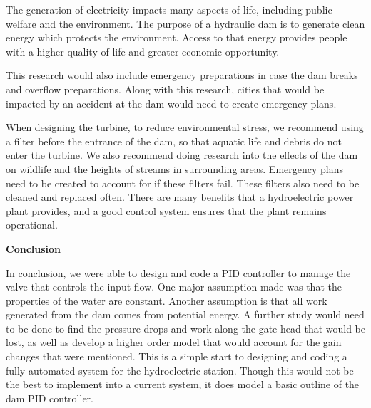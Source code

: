 \documentclass{article}
\begin{document}
\begin{multicols*}{2}
        The generation of electricity impacts many aspects of life, including public welfare and the environment. The purpose of a hydraulic dam is to generate clean energy which protects the environment. Access to that energy provides people with a higher quality of life and greater economic opportunity.

        This research would also include emergency preparations in case the dam breaks and overflow preparations. Along with this research, cities that would be impacted by an accident at the dam would need to create emergency plans.

        When designing the turbine, to reduce environmental stress, we recommend using a filter before the entrance of the dam, so that aquatic life and debris do not enter the turbine. We also recommend doing research into the effects of the dam on wildlife and the heights of streams in surrounding areas. Emergency plans need to be created to account for if these filters fail. These filters also need to be cleaned and replaced often.
        There are many benefits that a hydroelectric power plant provides, and a good control system ensures that the plant remains operational.

        \begin{center}
            \textbf{Conclusion}
        \end{center}

        In conclusion, we were able to design and code a PID controller to manage the valve that controls the input flow.  One major assumption made was that the properties of the water are constant.  Another assumption is that all work generated from the dam comes from potential energy.  A further study would need to be done to find the pressure drops and work along the gate head that would be lost, as well as develop a higher order model that would account for the gain changes that were mentioned. This is a simple start to designing and coding a fully automated system for the hydroelectric station.  Though this would not be the best to implement into a current system, it does model a basic outline of the dam PID controller. 


    \end{multicols*}
\end{document}
